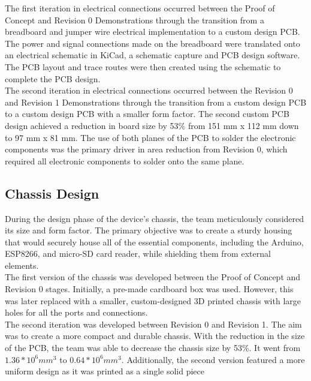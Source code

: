\documentclass[12pt]{article}
\begin{document}
The first iteration in electrical connections occurred between the Proof of Concept and Revision 0 Demonstrations through the transition from a breadboard and jumper wire electrical implementation to a custom design PCB. The power and signal connections made on the breadboard were translated onto an electrical schematic in KiCad, a schematic capture and PCB design software. The PCB layout and trace routes were then created using the schematic to complete the PCB design. \\

The second iteration in electrical connections occurred between the Revision 0 and Revision 1 Demonstrations through the transition from a custom design PCB to a custom design PCB with a smaller form factor. The second custom PCB design achieved a reduction in board size by 53\% from 151 mm x 112 mm down to 97 mm x 81 mm. The use of both planes of the PCB to solder the electronic components was the primary driver in area reduction from Revision 0, which required all electronic components to solder onto the same plane. \\

\subsection{Chassis Design}
During the design phase of the device's chassis, the team meticulously considered its size and form factor. The primary objective was to create a sturdy housing that would securely house all of the essential components, including the Arduino, ESP8266, and micro-SD card reader, while shielding them from external elements.\\

The first version of the chassis was developed between the Proof of Concept and Revision 0 stages. Initially, a pre-made cardboard box was used. However, this was later replaced with a smaller, custom-designed 3D printed chassis with large holes for all the ports and connections.\\

The second iteration was developed between Revision 0 and Revision 1. The aim was to create a more compact and durable chassis. With the reduction in the size of the PCB, the team was able to decrease the chassis size by 53\%. It went from $1.36*10^6 mm^3$ to $0.64*10^6mm^3$. Additionally, the second version featured a more uniform design as it was printed as a single solid piece
\end{document}
